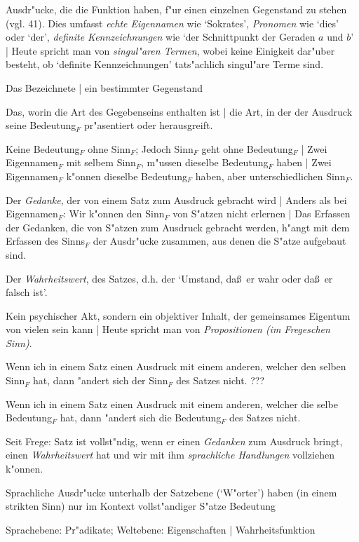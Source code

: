 \documentclass[emulatestandardclasses]{scrartcl}
\begin{document}
\begin{description}[leftmargin=!,labelwidth=\widthof{\bfseries 2}]
  \item[Eigenname$_{F}$] Ausdr"ucke, die die Funktion haben, f"ur einen einzelnen Gegenstand zu stehen (vgl. 41). Dies umfasst \emph{echte Eigennamen} wie `Sokrates', \emph{Pronomen} wie `dies' oder `der', \emph{definite Kennzeichnungen} wie `der Schnittpunkt der Geraden $a$ und $b$' | Heute spricht man von \emph{singul"aren Termen}, wobei keine Einigkeit dar"uber besteht, ob `definite Kennzeichnungen' tats"achlich singul"are Terme sind.
  \item[Bedeutung$_{F}$ eines Eigennamen$_{F}$] Das Bezeichnete | ein bestimmter Gegenstand
  \item[Sinn$_{F}$ eines Eigennamen$_{F}$] Das, worin die Art des Gegebenseins enthalten ist | die Art, in der der Ausdruck seine Bedeutung$_{F}$ pr"asentiert oder herausgreift.
  \item[Beziehung Sinn$_{F}$ - Bedeutung$_{F}$] Keine Bedeutung$_{F}$ ohne Sinn$_{F}$; Jedoch Sinn$_{F}$ geht ohne Bedeutung$_{F}$ | Zwei Eigennamen$_{F}$ mit selbem Sinn$_{F}$, m"ussen dieselbe Bedeutung$_{F}$ haben | Zwei Eigennamen$_{F}$ k"onnen dieselbe Bedeutung$_{F}$ haben, aber unterschiedlichen Sinn$_{F}$.
  \item[Sinn$_{F}$ eines Satzes] Der \emph{Gedanke}, der von einem Satz zum Ausdruck gebracht wird | Anders als bei Eigennamen$_{F}$: Wir k"onnen den Sinn$_{F}$ von S"atzen nicht erlernen | Das Erfassen der Gedanken, die von S"atzen zum Ausdruck gebracht werden, h"angt mit dem Erfassen des Sinns$_{F}$ der Ausdr"ucke zusammen, aus denen die S"atze aufgebaut sind.
  \item[Bedeutung$_{F}$ eines Satzes] Der \emph{Wahrheitswert},  des Satzes, d.h. der `Umstand, da\ss~er wahr oder da\ss~er falsch ist'.
  \item[Gedanke] Kein psychischer Akt, sondern ein objektiver Inhalt, der gemeinsames Eigentum von vielen sein kann | Heute spricht man von \emph{Propositionen (im Fregeschen Sinn)}. 
  \item[Kompositionalit"at des Sinns$_{F}$] Wenn ich in einem Satz einen Ausdruck mit einem anderen, welcher den selben Sinn$_{F}$ hat, dann "andert sich der Sinn$_{F}$ des Satzes nicht. {\color{red}???}
  \item[Kompositionalit"at der Bedeutung$_{F}$] Wenn ich in einem Satz einen Ausdruck mit einem anderen, welcher die selbe Bedeutung$_{F}$ hat, dann "andert sich die Bedeutung$_{F}$ des Satzes nicht.
  \item[Satz] Seit Frege: Satz ist vollst"ndig, wenn er einen \emph{Gedanken} zum Ausdruck bringt, einen \emph{Wahrheitswert} hat und wir mit ihm \emph{sprachliche Handlungen} vollziehen k"onnen.
  \item[Kontextprinzip] Sprachliche Ausdr"ucke unterhalb der Satzebene (`W"orter') haben (in einem strikten Sinn) nur im Kontext vollst"andiger S"atze Bedeutung
    \item[Pr"adikat] Sprachebene: Pr"adikate; Weltebene: Eigenschaften | Wahrheitsfunktion
\end{description}
\end{document}
